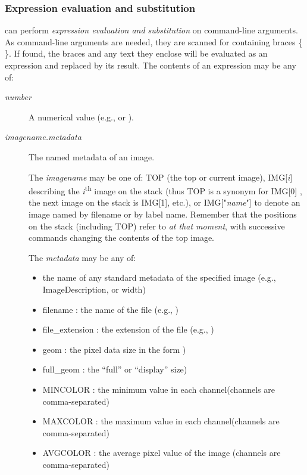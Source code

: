 \subsubsection*{Expression evaluation and substitution}
\label{oiiotoolexpr}

\oiiotool can perform \emph{expression evaluation and substitution} on
command-line arguments. As command-line arguments are needed, they are
scanned for containing braces {\cf \{ \}}. If found, the braces and any
text they enclose will be evaluated as an expression and replaced by its
result. The contents of an expression may be any of:

\begin{description}
\item[{\emph{number}}]

A numerical value (e.g., {} or {}).

\item[{\emph{imagename.metadata}}]

The named metadata of an image.

The \emph{imagename} may be one of: {\cf TOP} (the top or current image),
{\cf IMG[}\emph{i}{\cf ]} describing the \emph{i}{\textsuperscript{th}} image
on the stack (thus {\cf TOP} is a synonym for {\cf IMG[0]} , the next image
on the stack is {\cf IMG[1]}, etc.), or {\cf IMG["}\emph{name}{\cf "]} to
denote an image named by filename or by label name. Remember that the
positions on the stack (including TOP) refer to \emph{at that moment},
with successive commands changing the contents of the top image.

The \emph{metadata} may be any of:

\begin{itemize}
\item the name of any standard metadata of the
specified image (e.g., {\cf ImageDescription}, or {\cf width})
\item {\cf filename} : the name of the file (e.g., )
\item {\cf file_extension} : the extension of the file (e.g., )
\item {\cf geom} : the pixel data size in the form )
\item {\cf full_geom} : the ``full'' or ``display'' size)
\item {\cf MINCOLOR} : the minimum value in each channel(channels are comma-separated)
\item {\cf MAXCOLOR} : the maximum value in each channel(channels are comma-separated)
\item {\cf AVGCOLOR} : the average pixel value of the image (channels are comma-separated)
\end{itemize}


\end{description}

